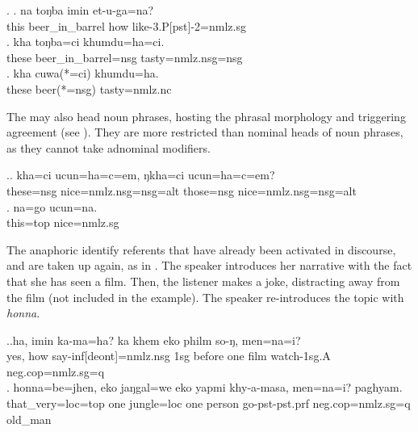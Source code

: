 \ex. \ag. 	na toŋba imin et-u-ga=na?\\
			this beer\_in\_barrel how like{\sc -3.P[pst]-2=nmlz.sg}\\
			\bg.	kha toŋba=ci khumdu=ha=ci.\\
			these beer\_in\_barrel{\sc =nsg} tasty{\sc =nmlz.nsg=nsg}\\
			\bg.	kha cuwa(*=ci) khumdu=ha.\\
			these beer{\sc (*=nsg)} tasty{\sc =nmlz.nc}\\
				
The  may also head noun phrases, hosting the phrasal morphology and triggering agreement (see \Next). They are more restricted than nominal heads of noun phrases, as they cannot take adnominal modifiers.  
			
	\ex.\ag.	kha=ci ucun=ha=c=em, ŋkha=ci ucun=ha=c=em?\\
			these{\sc =nsg} nice{\sc =nmlz.nsg=nsg=alt} those{\sc =nsg} nice{\sc =nmlz.nsg=nsg=alt}\\ 
	\bg. 	na=go ucun=na.\\
			this{\sc =top} nice{\sc =nmlz.sg}\\

			
The anaphoric  identify referents that have already been activated in discourse, and are taken up again, as in \Next. The speaker introduces her narrative with the fact that she has seen a film. Then, the listener makes a joke, distracting away from the film (not included in the example).  The speaker re-introduces the topic with \emph{honna}.

\ex.\ag.ha,    imin ka-ma=ha? ka       khem    eko philm so-ŋ, men=na=i?\\
yes, how say{\sc -inf[deont]=nmlz.nsg}  {\sc 1sg} before one film watch{\sc [3.P;pst]-1sg.A} {\sc neg.cop=nmlz.sg=q}\\
\bg. honna=be=jhen,  eko jaŋgal=we    eko yapmi  khy-a-masa,    men=na=i?    paghyam.\\
that\_very{\sc =loc=top} one jungle{\sc =loc} one person go{\sc [3sg]-pst-pst.prf} {\sc neg.cop=nmlz.sg=q} old\_man \\
  

